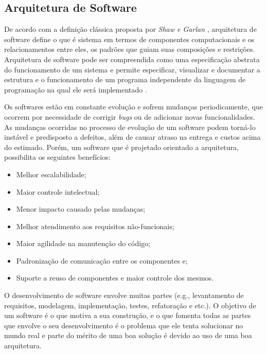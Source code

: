 \subsection{Arquitetura de Software}
De acordo com a definição clássica proposta por \textit{Shaw e Garlan} \cite{shaw_and_garlan}, arquitetura de software define o que é sistema em termos de componentes computacionais e os relacionamentos entre eles, os padrões que guiam suas composições e restrições. Arquitetura de software pode ser compreendida como uma especificação abstrata do funcionamento de um sistema e permite especificar, visualizar e documentar a estrutura e o funcionamento de um programa independente da linguagem de programação na qual ele será implementado \cite{jair_Cavalcanti_leite}.\par

Os softwares estão em constante evolução e sofrem mudanças periodicamente, que ocorrem por necessidade de corrigir \textit{bugs} ou de adicionar novas funcionalidades. As mudanças ocorridas no processo de evolução de um software podem torná-lo instável e predisposto a defeitos, além de causar atraso na entrega e custos acima do estimado. Porém, um software que é projetado orientado a arquitetura, possibilita os seguintes benefícios:
\begin{itemize}
		\item Melhor escalabilidade;
		\item Maior controle intelectual;
		\item Menor impacto causado pelas mudanças;
		\item Melhor atendimento aos requisitos não-funcionais;
		\item Maior agilidade na manutenção do código;
		\item Padronização de comunicação entre os componentes e;
		\item Suporte a reuso de componentes e maior controle dos mesmos.
\end{itemize}

O desenvolvimento de software envolve muitas partes (e.g., levantamento de requisitos, modelagem, implementação, testes, refatoração e etc.). O objetivo de um software é o que motiva a sua construção, e o que fomenta todas as partes que envolve o seu desenvolvimento é o problema que ele tenta solucionar no mundo real e parte do mérito de uma boa solução é devido ao uso de uma boa arquitetura.\par

